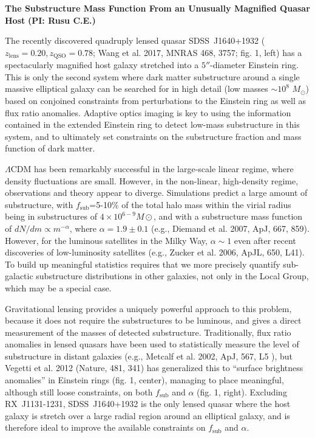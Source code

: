 \documentclass[a4paper,11pt]{article}
\begin{document}
\begin {centering}
{\bf The Substructure Mass Function From an Unusually Magnified Quasar Host} {\bf (PI: Rusu C.E.)}\\
 \end{centering}
 
\medskip

 The recently discovered quadruply lensed quasar SDSS~J1640+1932 ($z_\mathrm{lens}=0.20, z_\mathrm{QSO}=0.78$; Wang et al. 2017, MNRAS 468, 3757; fig. 1, left) has a spectacularly magnified host galaxy stretched into a $5''$-diameter Einstein ring. This is only the second system where dark matter substructure around a single massive elliptical galaxy can be searched for in high detail (low masses $\sim10^8$ $M_\odot$) based on conjoined constraints from perturbations to the Einstein ring as well as flux ratio anomalies. Adaptive optics imaging is key to using the information contained in the extended Einstein ring to detect low-mass substructure in this system, and to ultimately set constraints on the substructure fraction and mass function of dark matter.

$\Lambda$CDM has been remarkably successful in the large-scale linear regime, where density fluctuations are small. However, in the non-linear, high-density regime, observations and theory appear to diverge. Simulations predict a large amount of substructure, with $f_\mathrm{sub}$=5-10\% of the total halo mass within the virial radius being in substructures of $4\times10^{6-9} M\odot$, and with a substructure mass function of $dN/dm\propto m^{-\alpha}$, where $\alpha=1.9\pm0.1$ (e.g., Diemand et al. 2007, ApJ, 667, 859). However, for the luminous satellites in the Milky Way, $\alpha\sim1$ even after recent discoveries of low-luminosity satellites (e.g., Zucker et al. 2006, ApJL, 650, L41). To build up meaningful statistics requires that we more precisely quantify sub-galactic substructure distributions in other galaxies, not only in the Local Group, which may be a special case. 

Gravitational lensing provides a uniquely powerful approach to this problem, because it does not require the substructures to be luminous, and gives a direct measurement of the masses of detected substructure. Traditionally, flux ratio anomalies in lensed quasars have been used to statistically measure the level of substructure in distant galaxies (e.g., Metcalf et al. 2002, ApJ, 567, L5 ), but Vegetti et al. 2012 (Nature, 481, 341) has generalized this to ``surface brightness anomalies'' in Einstein rings (fig. 1, center), managing to place meaningful, although still loose constraints, on both $f_\mathrm{sub}$ and $\alpha$ (fig. 1, right). Excluding RX~J1131-1231, SDSS~J1640+1932 is the only lensed quasar where the host galaxy is stretch over a large radial region around an elliptical galaxy, and is therefore ideal to improve the available constraints on $f_\mathrm{sub}$ and $\alpha$.
\end{document}
